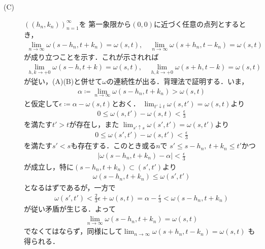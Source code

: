 \begin{prf}
\begin{description}
\begin{description}
					\item[(C)] $((h_n,k_n))_{n=1}^{\infty}$を
						第一象限から$(0,0)$に近づく任意の点列とするとき，
						\begin{align}
							\lim_{n \to \infty} \omega(s-h_n, t+k_n) = \omega(s,t),
							\quad \lim_{n \to \infty} \omega(s+h_n, t-k_n) = \omega(s,t)
						\end{align}
						が成り立つことを示す．これが示されれば
						\begin{align}
							\lim_{h,k \to +0} \omega(s-h, t+k) = \omega(s,t),
							\quad \lim_{h,k \to +0} \omega(s+h, t-k) = \omega(s,t)
						\end{align}
						が従い，(A)(B)と併せて$\omega$の連続性が出る．背理法で証明する．いま，
						\begin{align}
							\alpha \coloneqq \lim_{n \to \infty} \omega(s-h_n, t+k_n)
							> \omega(s,t)
						\end{align}
						と仮定して$\epsilon \coloneqq \alpha - \omega(s,t)$とおく．
						$\lim_{t' \downarrow t}\omega(s,t') = \omega(s,t)$より
						\begin{align}
							0 \leq \omega(s,t') - \omega(s,t) < \frac{\epsilon}{3}
						\end{align}
						を満たす$t' > t$が存在し，また
						$\lim_{s' \uparrow s}\omega(s',t') = \omega(s,t')$より
						\begin{align}
							0 \leq \omega(s',t') - \omega(s,t') < \frac{\epsilon}{3}
						\end{align}
						を満たす$s' < s$も存在する．このとき或る$n$で
						$s' \leq s- h_n,\ t + k_n \leq t'$かつ
						\begin{align}
							|\omega(s-h_n, t+k_n) - \alpha| < \frac{\epsilon}{3}
						\end{align}
						が成立し，特に$(s-h_n, t+k_n) \subset (s',t')$より
						\begin{align}
							\omega(s-h_n, t+k_n) \leq \omega(s',t')
						\end{align}
						となるはずであるが，一方で
						\begin{align}
							\omega(s',t') < \frac{2}{3}\epsilon + \omega(s,t)
							 = \alpha - \frac{\epsilon}{3}
							 < \omega(s-h_n, t+k_n)
						\end{align}
						が従い矛盾が生じる．よって
						\begin{align}
							\lim_{n \to \infty} \omega(s-h_n, t+k_n) = \omega(s,t)
						\end{align}
						でなくてはならず，同様にして$\lim_{n \to \infty} \omega(s+h_n, t-k_n) = \omega(s,t)$
						も得られる．
						\QED
				\end{description}
		\end{description}
	\end{prf}
	
